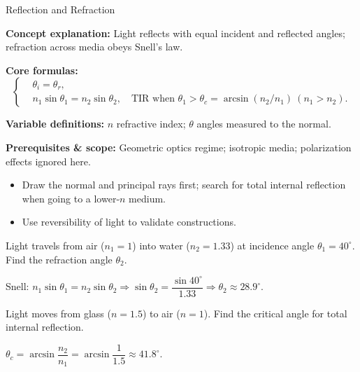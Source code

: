 \label{unit:optics}

\begin{KnowledgePoint}{Reflection and Refraction \Core}
  \KPFormulas
  \begin{formulabox}
  \textbf{Concept explanation:} Light reflects with equal incident and reflected angles; refraction across media obeys Snell's law.

  \textbf{Core formulas:}
  \[
  \left\{\begin{aligned}
    &\theta_i=\theta_r,\\
    &n_1\sin\theta_1=n_2\sin\theta_2,\quad \text{TIR when }\theta_1>\theta_c=\arcsin(n_2/n_1)\ (n_1>n_2).
  \end{aligned}\right.
  \]

  \textbf{Variable definitions:} $n$ refractive index; $\theta$ angles measured to the normal.

  \textbf{Prerequisites \& scope:} Geometric optics regime; isotropic media; polarization effects ignored here.
  \end{formulabox}

  \KPHeuristics
  \begin{heuristicsbox}
  \begin{itemize}[leftmargin=*]
    \item Draw the normal and principal rays first; search for total internal reflection when going to a lower-$n$ medium.
    \item Use reversibility of light to validate constructions.
  \end{itemize}
  \end{heuristicsbox}

  \KPProblems
\begin{cheatproblem}
  Light travels from air ($n_1=1$) into water ($n_2=1.33$) at incidence angle $\theta_1=40^\circ$. Find the refraction angle $\theta_2$.
\begin{solutionbox}
  Snell: $n_1\sin\theta_1=n_2\sin\theta_2\Rightarrow\sin\theta_2=\dfrac{\sin40^\circ}{1.33}\Rightarrow\theta_2\approx28.9^\circ$.
\end{solutionbox}
\end{cheatproblem}
\begin{cheatproblem}
  Light moves from glass ($n=1.5$) to air ($n=1$). Find the critical angle for total internal reflection.
\begin{solutionbox}
  $\theta_c=\arcsin\dfrac{n_2}{n_1}=\arcsin\dfrac{1}{1.5}\approx41.8^\circ$.
\end{solutionbox}
\end{cheatproblem}
\end{KnowledgePoint}

